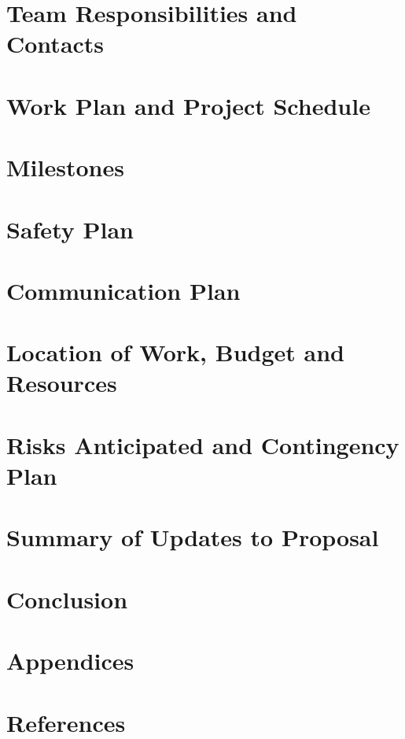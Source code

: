 \documentclass[amsmath, amssymb, aps, 12pt]{revtex4-1}
\begin{document}
\section{\label{sec:responsabilities}Team Responsibilities and Contacts}


\section{\label{sec:schedule}Work Plan and Project Schedule}


\section{\label{sec:milestones}Milestones}


\section{\label{sec:safety-plan}Safety Plan}


\section{\label{sec:communication-plan}Communication Plan}


\section{\label{sec:resources}Location of Work, Budget and Resources}


\section{\label{sec:contingency-plan}Risks Anticipated and Contingency Plan}


\section{\label{sec:update-summary}Summary of Updates to Proposal}


\section{\label{sec:conclusion}Conclusion}


\section{\label{sec:appendices}Appendices}


\section{\label{sec:references}References}

\end{document}
